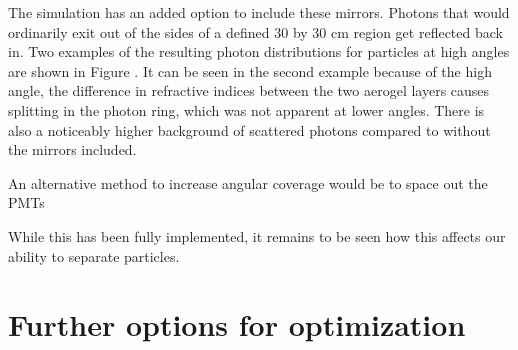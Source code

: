 The simulation has an added option to include these mirrors.
Photons that would ordinarily exit out of the sides of a defined 30 by 30 cm region get reflected back in.
Two examples of the resulting photon distributions for particles at high angles are shown in Figure .
It can be seen in the second example because of the high angle, the difference in refractive indices between the two aerogel layers causes splitting in the photon ring, which was not apparent at lower angles.
There is also a noticeably higher background of scattered photons compared to without the mirrors included.

An alternative method to increase angular coverage would be to space out the PMTs

While this has been fully implemented, it remains to be seen how this affects our ability to separate particles. 

\section{Further options for optimization}


\endinput 

Any text after an \endinput is ignored.
You could put scraps here or things in progress.
